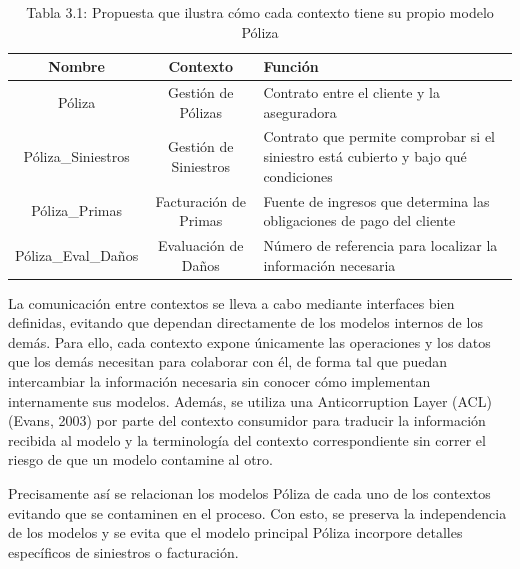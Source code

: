 \documentclass[12pt, a4paper]{article}
\begin{document}
        \begin{table}[H]

            \begin{tabular}{|c|c|p{5cm}|}

                \toprule

                Nombre&Contexto&Función\\

                \midrule

                Póliza&Gestión de Pólizas&Contrato entre el cliente y la aseguradora\\

                Póliza\_Siniestros&Gestión de Siniestros&Contrato que permite comprobar si el siniestro está cubierto y bajo qué condiciones\\

                Póliza\_Primas&Facturación de Primas&Fuente de ingresos que determina las obligaciones de pago del cliente\\

                Póliza\_Eval\_Daños&Evaluación de Daños&Número de referencia para localizar la información necesaria\\

                \bottomrule

            \end{tabular}

            \caption*{Tabla 3.1: Propuesta que ilustra cómo cada contexto tiene su propio modelo Póliza}

            \label{tab:Tabla3.1}

        \end{table}

        La comunicación entre contextos se lleva a cabo mediante interfaces bien definidas, evitando que dependan directamente de los modelos internos de los demás. Para ello, cada contexto expone únicamente las operaciones y los datos que los demás necesitan para colaborar con él, de forma tal que puedan intercambiar la información necesaria sin conocer cómo implementan internamente sus modelos. Además, se utiliza una Anticorruption Layer (ACL) (Evans, 2003) por parte del contexto consumidor para traducir la información recibida al modelo y la terminología del contexto correspondiente sin correr el riesgo de que un modelo contamine al otro.

        Precisamente así se relacionan los modelos Póliza de cada uno de los contextos evitando que se contaminen en el proceso. Con esto, se preserva la independencia de los modelos y se evita que el modelo principal Póliza incorpore detalles específicos de siniestros o facturación.
\end{document}
